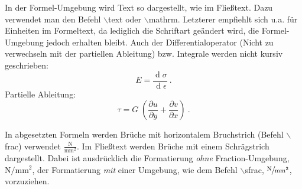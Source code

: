 In der Formel-Umgebung wird Text so dargestellt, wie im Fließtext. Dazu verwendet man den Befehl $\backslash$text oder $\backslash$mathrm. Letzterer empfiehlt sich u.a. für Einheiten im Formeltext, da lediglich die Schriftart geändert wird, die Formel-Umgebung jedoch erhalten bleibt. Auch der Differentialoperator (Nicht zu verwechseln mit der partiellen Ableitung) bzw. Integrale werden nicht kursiv geschrieben:
\begin{equation}
E=\frac{\operatorname{d} \! \sigma}{\operatorname{d} \! \epsilon} \:.
\end{equation}
Partielle Ableitung:
\begin{equation}
\tau=G \;\left(\frac{\partial u}{\partial y} + \frac{\partial v}{\partial x}\right) \:.
\end{equation}

In abgesetzten Formeln werden Brüche mit horizontalem Bruchstrich (Befehl $\backslash$frac{}{}) verwendet  $\mathrm{\frac{N}{mm^2}}$. Im Fließtext werden Brüche mit einem Schrägstrich dargestellt. Dabei ist ausdrücklich die Formatierung \emph{ohne} Fraction-Umgebung, $\mathrm{N/mm^2}$, der Formatierung \emph{mit} einer Umgebung, wie dem Befehl $\backslash$sfrac{}{}, $\mathrm{\sfrac{N}{mm^2}}$, vorzuziehen.

